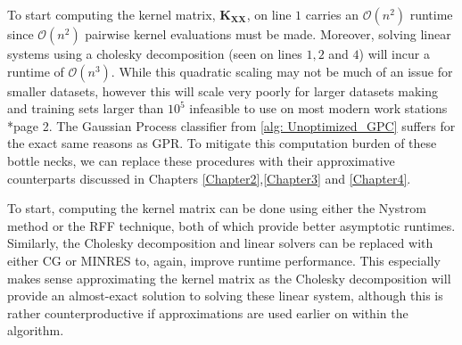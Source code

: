 To start computing the kernel matrix, $\bm{K_{XX}}$, on line $1$ carries an $\mathcal{O} \left( n^2 \right)$ runtime since $\mathcal{O} \left( n^2 \right)$ pairwise kernel evaluations must be made. Moreover, solving linear systems using a cholesky decomposition (seen on lines $1,2$ and $4$) will incur a runtime of $\mathcal{O} \left( n^3 \right)$. While this quadratic scaling may not be much of an issue for smaller datasets, however this will scale very poorly for larger datasets making and training sets larger than $10^5$ infeasible to use on most modern work stations \cite{DBLP:journals/corr/abs-2112-15246}*{page 2}. The Gaussian Process classifier from \cref{alg: Unoptimized_GPC} suffers for the exact same reasons as GPR. To mitigate this computation burden of these bottle necks, we can replace these procedures with their approximative counterparts discussed in Chapters \ref{Chapter2},\ref{Chapter3} and \ref{Chapter4}.

To start, computing the kernel matrix can be done using either the Nystrom method or the RFF technique, both of which provide better asymptotic runtimes. Similarly, the Cholesky decomposition and linear solvers can be replaced with either CG or MINRES to, again, improve runtime performance. This especially makes sense approximating the kernel matrix as the Cholesky decomposition will provide an almost-exact solution to solving these linear system, although this is rather counterproductive if approximations are used earlier on within the algorithm.